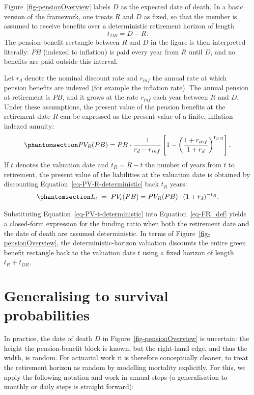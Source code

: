 \documentclass[
  letterpaper,
  DIV=11,
  numbers=noendperiod]{scrreprt}
\begin{document}
Figure~\ref{fig-pensionOverview} labels \(D\) as the expected date of
death. In a basic version of the framework, one treats \(R\) and \(D\)
as fixed, so that the member is assumed to receive benefits over a
deterministic retirement horizon of length \[
    t_{DR} = D - R.
\] The pension-benefit rectangle between \(R\) and \(D\) in the figure
is then interpreted literally: \(PB\) (indexed to inflation) is paid
every year from \(R\) until \(D\), and no benefits are paid outside this
interval.

Let \(r_d\) denote the nominal discount rate and \(r_{inf}\) the annual
rate at which pension benefits are indexed (for example the inflation
rate). The annual pension at retirement is \(PB\), and it grows at the
rate \(r_{inf}\) each year between \(R\) and \(D\). Under these
assumptions, the present value of the pension benefits at the retirement
date \(R\) can be expressed as the present value of a finite,
inflation-indexed annuity:
\begin{equation}\protect\phantomsection\label{eq-PV-R-deterministic}{
PV_{R}(PB) = PB \cdot \frac{1}{r_d - r_{inf}} \left[ 1 - \left(\frac{1 + r_{inf}}{1 + r_d}\right)^{t_{DR}} \right].
}\end{equation} If \(t\) denotes the valuation date and \(t_R = R - t\)
the number of years from \(t\) to retirement, the present value of the
liabilities at the valuation date is obtained by discounting
Equation~\ref{eq-PV-R-deterministic} back \(t_R\) years:
\begin{equation}\protect\phantomsection\label{eq-PV-t-deterministic}{
    L_{t} \;=\; PV_{t}(PB) = PV_R(PB) \cdot (1 + r_d)^{-t_R}.
}\end{equation}

Substituting Equation~\ref{eq-PV-t-deterministic} into
Equation~\ref{eq-FR_def} yields a closed-form expression for the funding
ratio when both the retirement date and the date of death are assumed
deterministic. In terms of Figure~\ref{fig-pensionOverview}, the
deterministic-horizon valuation discounts the entire green benefit
rectangle back to the valuation date \(t\) using a fixed horizon of
length \(t_R + t_{DR}\).

\section{Generalising to survival
probabilities}\label{generalising-to-survival-probabilities}

In practice, the date of death \(D\) in Figure~\ref{fig-pensionOverview}
is uncertain: the height the pension-benefit block is known, but the
right-hand edge, and thus the width, is random. For actuarial work it is
therefore conceptually cleaner, to treat the retirement horizon as
random by modelling mortality explicitly. For this, we apply the
following notation and work in annual steps (a generalisation to monthly
or daily steps is straight forward):
\end{document}
